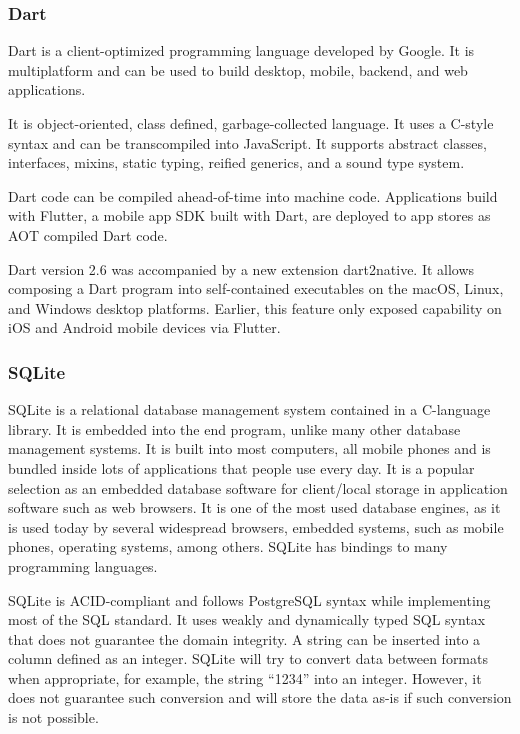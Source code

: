 \subsubsection{Dart}
Dart is a client-optimized programming language developed by Google. It is multiplatform and can be used to build desktop, mobile, backend, and web applications.

It is object-oriented, class defined, garbage-collected language. It uses a C-style syntax and can be transcompiled into JavaScript. It supports abstract classes, interfaces, mixins, static typing, reified generics, and a sound type system.

Dart code can be compiled ahead-of-time into machine code. Applications build with Flutter, a mobile app SDK built with Dart, are deployed to app stores as AOT compiled Dart code.

Dart version 2.6 was accompanied by a new extension dart2native. It allows composing a Dart program into self-contained executables on the macOS, Linux, and Windows desktop platforms. Earlier, this feature only exposed capability on iOS and Android mobile devices via Flutter.~\cite{dart-wiki}

\subsubsection{SQLite}
SQLite is a relational database management system contained in a C-language library. It is embedded into the end program, unlike many other database management systems. It is built into most computers, all mobile phones and is bundled inside lots of applications that people use every day. It is a popular selection as an embedded database software for client/local storage in application software such as web browsers. It is one of the most used database engines, as it is used today by several widespread browsers, embedded systems, such as mobile phones, operating systems, among others. SQLite has bindings to many programming languages.

SQLite is ACID-compliant and follows PostgreSQL syntax while implementing most of the SQL standard. It uses weakly and dynamically typed SQL syntax that does not guarantee the domain integrity. A string can be inserted into a column defined as an integer. SQLite will try to convert data between formats when appropriate, for example, the string ``1234'' into an integer. However, it does not guarantee such conversion and will store the data as-is if such conversion is not possible.~\cite{sqlite-wiki}

